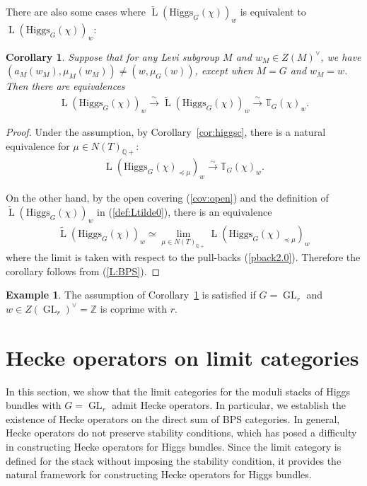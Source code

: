 \documentclass [11pt,oneside,a4paper,mathscr]{amsart}
\newtheorem{cor}[thm]{Corollary}
\theoremstyle{definition}
\newtheorem{example}[thm]{Example}
\newcommand{\LL}{\operatorname{L}}
\newcommand{\GL}{\operatorname{GL}}
\newcommand{\Hig}{\mathrm{Higgs}}
\begin{document}
There are also some cases where $\widetilde{\LL}(\Hig_G(\chi))_w$ is equivalent to 
$\LL(\Hig_G(\chi))_w$: 
\begin{cor}\label{cor:coprime}
Suppose that for any Levi subgroup $M$ and $w_M \in Z(M)^{\vee}$, 
we have $(a_M(w_M), \mu_M(w_M)) \neq (w, \mu_G(w))$,
except when $M=G$ and $w_M=w$. Then there are equivalences
\begin{align*}
\LL(\Hig_{G}(\chi))_w\stackrel{\sim}{\to} \widetilde{\LL}(\Hig_{G}(\chi))_w\stackrel{\sim}{\to}\mathbb{T}_{G}(\chi)_w. 
\end{align*}
\end{cor}
\begin{proof}
Under the assumption, by Corollary~\ref{cor:higgsc},
there is a natural equivalence for $\mu \in N(T)_{\mathbb{Q}+}$:
\begin{align}\label{L:BPS}
    \LL(\Hig_{G}(\chi)_{\preceq \mu})_{w}
    \stackrel{\sim}{\to} \mathbb{T}_{G}(\chi)_w.
\end{align}

On the other hand, by the open covering (\ref{cov:open}) and the 
definition of $\widetilde{\LL}(\Hig_{G}(\chi))_w$ in 
(\ref{def:Ltilde0}), 
there is an equivalence
\begin{align*}
\widetilde{\LL}(\Hig_{G}(\chi))_w \simeq \lim_{\mu\in N(T)_{\mathbb{Q}+}}\LL(\Hig_{G}(\chi)_{\preceq \mu})_w
\end{align*}
where the limit is taken with respect to the pull-backs (\ref{pback2.0}). 
Therefore the corollary follows from (\ref{L:BPS}).
    \end{proof}

\begin{example}\label{exam:coprime}
The assumption of Corollary~\ref{cor:coprime} is satisfied if $G=\GL_r$ and $w\in Z(\GL_r)^{\vee}=\mathbb{Z}$ is 
coprime with $r$. 
\end{example}





\section{Hecke operators on limit categories}\label{sec:hecke}
In this section, we show that the limit categories for the moduli stacks of Higgs bundles
with $G=\GL_r$ admit
Hecke operators. In particular, we establish the existence of Hecke
operators on the direct sum of BPS categories. In general, Hecke operators do not preserve
stability conditions, which has posed a difficulty in constructing Hecke operators for Higgs
bundles. Since the limit category is defined for the stack without imposing the stability
condition, it provides the natural framework for constructing Hecke operators for Higgs bundles.
\end{document}
